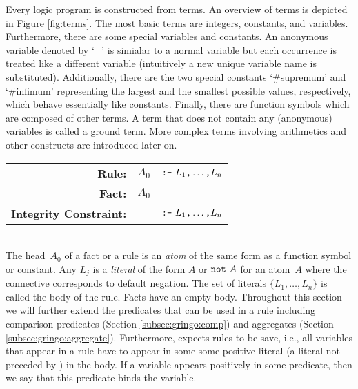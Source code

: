 Every logic program is constructed from terms.
An overview of \gringo{} terms is depicted in Figure \ref{fig:terms}.
The most basic terms are integers, constants, and variables.
Furthermore, there are some special variables and constants.
An anonymous variable denoted by `\_' is simialar to a normal variable 
but each occurrence is treated like a different variable 
(intuitively a new unique variable name is substituted).
Additionally, there are the two special constants `\#supremum' and `\#infimum'
representing the largest and the smallest possible values, respectively,
which behave essentially like constants.
Finally, there are function symbols which are composed of other terms.
A term that does not contain any (anonymous) variables is called a ground term.
More complex terms involving arithmetics and other constructs
are introduced later on.

\begin{tabular}{rl@{}l}\label{eq:normal:rule}
\textbf{Rule:} & $A_0$& $\texttt{:-}~L_1\texttt{,}\dots\texttt{,}L_n$\code{.}
\\
\textbf{Fact:} & $A_0$&\code{.}
\\
\textbf{Integrity Constraint:} & & $\texttt{:-}~L_1\texttt{,}\dots\texttt{,}L_n$\code{.}
\end{tabular}
\\

\noindent
The head~$A_0$ of a fact or a rule is an \emph{atom} of the same form
as a function symbol or constant.
Any $L_j$ is a \emph{literal} of the form $A$ or $\texttt{not}~A$
for an atom~$A$ where the connective  corresponds to default negation.
The set of literals $\{L_1,\dots,L_n\}$ is called the body of the rule.
Facts have an empty body.
Throughout this section we will further extend the predicates that can be used 
in a rule including comparison predicates (Section \ref{subsec:gringo:comp}) and aggregates (Section \ref{subsec:gringo:aggregate}).
Furthermore, \gringo{} expects rules to be save, i.e., 
all variables that appear in a rule have to appear in some some positive literal (a literal not preceded by ) in the body.
If a variable appears positively in some predicate, then we say that this predicate binds the variable.

